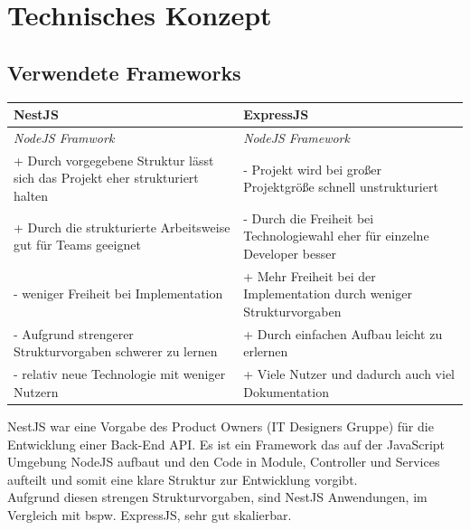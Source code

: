 \chapter{Technisches Konzept}

\section{Verwendete Frameworks}

\begin{table}[!ht]
    \centering
    \begin{tabular}{|l|l|} 
    \hline
    \textbf{NestJS}                                                                       & \textbf{ExpressJS}                                                                    \\ 
    \hline
    \emph{NodeJS Framwork}                                                              & \emph{NodeJS Framework}                                                             \\ 
    \hline
    + Durch vorgegebene Struktur lässt sich das Projekt eher strukturiert halten & - Projekt wird bei großer Projektgröße schnell unstrukturiert                \\ 
    \hline
    + Durch die strukturierte Arbeitsweise gut für Teams geeignet                & - Durch die Freiheit bei Technologiewahl eher für einzelne Developer besser  \\ 
    \hline
    - weniger Freiheit bei Implementation                                        & + Mehr Freiheit bei der Implementation durch weniger Strukturvorgaben        \\ 
    \hline
    - Aufgrund strengerer Strukturvorgaben schwerer zu lernen                    & + Durch einfachen Aufbau leicht zu erlernen                                  \\ 
    \hline
    - relativ neue Technologie mit weniger Nutzern                               & + Viele Nutzer und dadurch auch viel Dokumentation                           \\
    \hline
    \end{tabular}
    \end{table}

NestJS war eine Vorgabe des Product Owners (IT Designers Gruppe) für die Entwicklung einer Back-End API. 
Es ist ein Framework das auf der JavaScript Umgebung NodeJS aufbaut und den Code in Module, Controller und Services aufteilt und somit eine klare Struktur zur Entwicklung vorgibt.\\
Aufgrund diesen strengen Strukturvorgaben, sind NestJS Anwendungen, im Vergleich mit bspw. ExpressJS, sehr gut skalierbar.

